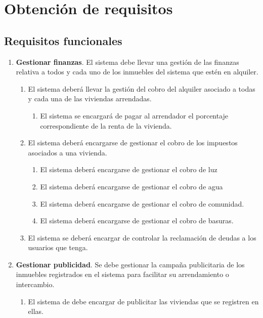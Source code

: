 \documentclass[10pt,a4paper]{article}
\begin{document}
{\footnotesize
\section{Obtención de requisitos}
\subsection*{Requisitos funcionales}
\begin{enumerate}[\bfseries RF-1]
\item \textbf{Gestionar finanzas}. El sistema debe llevar una gestión de las finanzas relativa a todos y cada uno de los inmuebles del sistema que estén en alquiler.
\begin{enumerate}[\bfseries RF-{1}.1]
\item El sistema deberá llevar la gestión del cobro del alquiler asociado a todas y cada una de las viviendas arrendadas.
\begin{enumerate}[\bfseries RF-{1}.{1}.1]
\item El sistema se encargará de pagar al arrendador el porcentaje correspondiente de la renta de la vivienda.
\end{enumerate}
\item El sistema deberá encargarse de gestionar el cobro de los impuestos asociados a una vivienda.
\begin{enumerate}[\bfseries RF-{1}.{2}.1]
\item El sistema deberá encargarse de gestionar el cobro de luz
\item El sistema deberá encargarse de gestionar el cobro de agua
\item El sistema deberá encargarse de gestionar el cobro de comunidad.
\item El sistema deberá encargarse de gestionar el cobro de basuras.
\end{enumerate}
\item El sistema se deberá encargar de controlar la reclamación de deudas a los usuarios que tenga.
\end{enumerate}
\item \textbf{Gestionar publicidad}. Se debe gestionar la campaña publicitaria de los inmuebles registrados en el sistema para facilitar su arrendamiento o intercambio.
\begin{enumerate}[\bfseries RF-{2}.1]
\item El sistema de debe encargar de publicitar las viviendas que se registren en ellas.
\begin{enumerate}[\bfseries RF-{2}.{1}.1]

\end{enumerate}
\end{enumerate}
\end{enumerate}}
\end{document}
